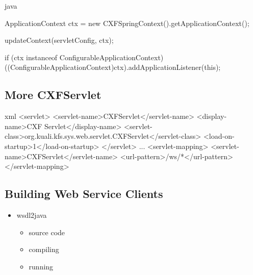 \documentclass[12pt,notitlepage]{article}
\begin{document}
\begin{s5presentation}
\begin{s5slide}
\begin{code}{java}
{    ApplicationContext ctx = new CXFSpringContext().getApplicationContext();
        
    updateContext(servletConfig, ctx);

    if (ctx instanceof ConfigurableApplicationContext) {
        ((ConfigurableApplicationContext)ctx).addApplicationListener(this);
    }
}
    \end{code}
  \W \end{s5slide}

%
%
  \W \begin{s5slide}
    \section{More CXFServlet }
    \begin{code}{xml}
<servlet>
	<servlet-name>CXFServlet</servlet-name>
	<display-name>CXF Servlet</display-name>
	<servlet-class>org.kuali.kfs.sys.web.servlet.CXFServlet</servlet-class>
	<load-on-startup>1</load-on-startup>
</servlet>
...
<servlet-mapping>
    <servlet-name>CXFServlet</servlet-name>
    <url-pattern>/ws/*</url-pattern>
</servlet-mapping>
    \end{code}
    
  \W \end{s5slide}

%
%
  \W \begin{s5slide}
    \section{Building Web Service Clients }
    \begin{itemize}
    \item wsdl2java
      \begin{itemize}
      \item source code
      \item compiling
      \item running
      \end{itemize}
      \end{itemize}
    \W \end{s5slide}

%
%
  \W \begin{s5slide}

\end{s5slide}
\end{s5presentation}
\end{document}
